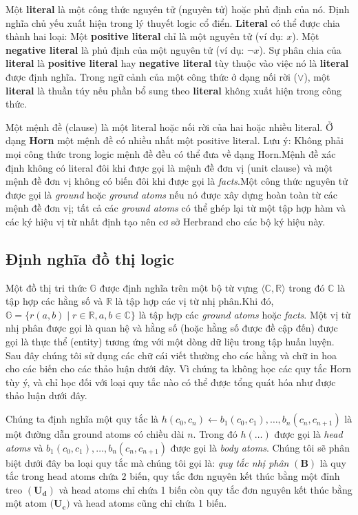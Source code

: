 Một \textbf{literal}\cite{wiki:Literal} là một công thức nguyên tử (nguyên tử) hoặc phủ định của nó. Định nghĩa chủ yếu xuất hiện trong lý thuyết logic cổ điển. \textbf{Literal} có thể được chia thành hai loại: Một \textbf{positive literal} chỉ là một nguyên tử (ví dụ: \(x\)). Một \textbf{negative literal} là phủ định của một nguyên tử (ví dụ: \(\neg x\)). Sự phân chia của \textbf{literal} là \textbf{positive literal} hay \textbf{negative literal} tùy thuộc vào việc nó là \textbf{literal} được định nghĩa. Trong ngữ cảnh của một công thức ở dạng nối rời (\(\vee\)), một \textbf{literal} là thuần túy nếu phần bổ sung theo \textbf{literal} không xuất hiện trong công thức.

Một mệnh đề (clause) là một literal hoặc nối rời của hai hoặc nhiều literal. Ở dạng \textbf{Horn} một mệnh đề có nhiều nhất một positive literal. Lưu ý: Không phải mọi công thức trong logic mệnh đề đều có thể đưa về dạng Horn.Mệnh đề xác định không có literal đôi khi được gọi là mệnh đề đơn vị (unit clause) và một mệnh đề đơn vị không có biến đôi khi được gọi là \textit{facts}\cite{wiki:Horn}.Một công thức nguyên tử được gọi là \textit{ground} hoặc \textit{ground atoms} nếu nó được xây dựng hoàn toàn từ các mệnh đề đơn vị; tất cả các \textit{ground atoms} có thể ghép lại từ một tập hợp hàm và các ký hiệu vị từ nhất định tạo nên cơ sở Herbrand cho các bộ ký hiệu này\cite{wiki:Term}.

\subsection{Định nghĩa đồ thị logic}
Một đồ thị tri thức \(\mathbb{G}\) được định nghĩa trên một bộ từ vựng \(\langle \mathbb{C}, \mathbb{R} \rangle\) trong đó \(\mathbb{C}\) là tập hợp các hằng số và \(\mathbb{R}\) là tập hợp các vị từ nhị phân.Khi đó, \(\mathbb{G} = \{r (a, b) \mid r \in \mathbb{R}, a, b \in \mathbb{C}\}\) là tập hợp các \textit{ground atoms} hoặc \textit{facts}. Một vị từ nhị phân được gọi là quan hệ và hằng số (hoặc hằng số được đề cập đến) được gọi là thực thể (entity) tương ứng với một dòng dữ liệu trong tập huấn luyện. Sau đây chúng tôi sử dụng các chữ cái viết thường cho các hằng và chữ in hoa cho các biến cho các thảo luận dưới đây. Vì chúng ta không học các quy tắc Horn tùy ý, và chỉ học đối với loại quy tắc nào có thể được tổng quát hóa như được thảo luận dưới đây.

Chúng ta định nghĩa một quy tắc là \(h(c_0, c_n) \gets b_1(c_0, c_1) ,\dots ,b_n(c_{n}, c_{n + 1})\) là một đường dẫn ground atoms có chiều dài \(n\). Trong đó \(h(\dots)\) được gọi là \textit{head atoms} và \( b_1(c_0, c_1) ,\dots ,b_n(c_{n}, c_{n + 1})\) được gọi là \textit{body atoms}. Chúng tôi sẽ phân biệt dưới đây ba loại quy tắc mà chúng tôi gọi là: \textit{quy tắc nhị phân} \((\mathbf{B})\) là quy tắc trong head atoms chứa 2 biến, quy tắc đơn nguyên kết thúc bằng một đỉnh treo \((\mathbf{U_d})\) và head atoms chỉ chứa 1 biến còn quy tắc đơn nguyên kết thúc bằng một atom \((\mathbf{U_c)}\) và head atoms cũng chỉ chứa 1 biến.

